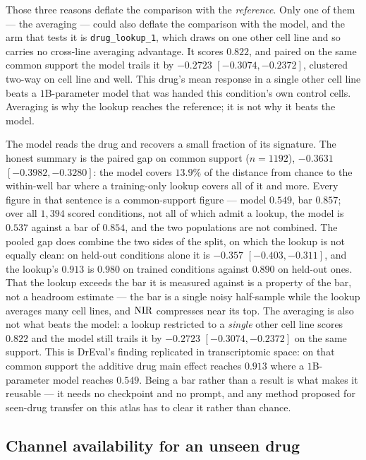 Those three reasons deflate the comparison with the \emph{reference}. Only one of them --- the
averaging --- could also deflate the comparison with the model, and the arm that tests it is
\texttt{drug\_lookup\_1}, which draws on one other cell line and so carries no cross-line averaging
advantage. It scores $0.822$, and paired on the same common support the model trails it by
$-0.2723$ \nolinebreak[3]$[-0.3074, -0.2372]$, clustered two-way on cell line and well. This drug's
mean response in a single other cell line beats a $1$B-parameter model that was handed this
condition's own control cells. Averaging is why the lookup reaches the reference; it is not why it
beats the model.

\begin{claim}
The model reads the drug and recovers a small fraction of its signature. The honest summary is
the paired gap on common support ($n = 1192$), $-0.3631$
\nolinebreak[3]$[-0.3982, -0.3280]$: the model covers $13.9\%$ of the distance from chance to the
within-well bar where a training-only lookup covers all of it and more. Every figure in that
sentence is a common-support figure --- model $0.549$, bar $0.857$; over all $1{,}394$ scored
conditions, not all of which admit a lookup, the model is $0.537$ against a bar of $0.854$, and the
two populations are not combined. The pooled gap does combine the two sides of the split, on which
the lookup is not equally clean: on held-out conditions alone it is $-0.357$
\nolinebreak[3]$[-0.403, -0.311]$, and the lookup's $0.913$ is $0.980$ on trained conditions against
$0.890$ on held-out ones. That the lookup exceeds the
bar it is measured against is a property of the bar, not a headroom estimate --- the bar is a single
noisy half-sample while the lookup averages many cell lines, and $\textrm{NIR}$ compresses near its top.
The averaging is also not what beats the model: a lookup restricted to a \emph{single} other cell
line scores $0.822$ and the model still trails it by $-0.2723$
\nolinebreak[3]$[-0.3074, -0.2372]$ on the same support. This is DrEval's finding replicated in
transcriptomic space: on that common support the additive drug main effect reaches $0.913$ where a
$1$B-parameter model reaches $0.549$. Being a bar rather than a result is what makes it reusable --- it needs no
checkpoint and no prompt, and any method proposed for seen-drug transfer on this atlas has to clear
it rather than chance.
\end{claim}

\subsection{Channel availability for an unseen drug}
\label{sec:res-scope}

